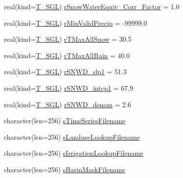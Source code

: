 \begin{DoxyCompactItemize}
\item 
real(kind=\hyperlink{namespacetypes_af3012489af4c138f271f1bce244b7e51}{T\_\-SGL}) \hyperlink{typetypes_1_1_t___m_o_d_e_l___c_o_n_f_i_g_u_r_a_t_i_o_n_a633b7317b357bdd5ec1837e6bf8c71dc}{rSnowWaterEquiv\_\-Corr\_\-Factor} = 1.0
\item 
real(kind=\hyperlink{namespacetypes_af3012489af4c138f271f1bce244b7e51}{T\_\-SGL}) \hyperlink{typetypes_1_1_t___m_o_d_e_l___c_o_n_f_i_g_u_r_a_t_i_o_n_a77f058263705478632125ac1d964d785}{rMinValidPrecip} = -\/99999.0
\item 
real(kind=\hyperlink{namespacetypes_af3012489af4c138f271f1bce244b7e51}{T\_\-SGL}) \hyperlink{typetypes_1_1_t___m_o_d_e_l___c_o_n_f_i_g_u_r_a_t_i_o_n_a849eb6df6879c3e23519f49f9d65322c}{rTMaxAllSnow} = 30.5
\item 
real(kind=\hyperlink{namespacetypes_af3012489af4c138f271f1bce244b7e51}{T\_\-SGL}) \hyperlink{typetypes_1_1_t___m_o_d_e_l___c_o_n_f_i_g_u_r_a_t_i_o_n_a1368525b4e815a98e8547ca59b47068e}{rTMaxAllRain} = 40.0
\item 
real(kind=\hyperlink{namespacetypes_af3012489af4c138f271f1bce244b7e51}{T\_\-SGL}) \hyperlink{typetypes_1_1_t___m_o_d_e_l___c_o_n_f_i_g_u_r_a_t_i_o_n_a7b7f6e5e817b0404fea20ae828fea7e6}{rSNWD\_\-slp1} = 51.3
\item 
real(kind=\hyperlink{namespacetypes_af3012489af4c138f271f1bce244b7e51}{T\_\-SGL}) \hyperlink{typetypes_1_1_t___m_o_d_e_l___c_o_n_f_i_g_u_r_a_t_i_o_n_a161b512f5dbd8520728de20c53e00d6c}{rSNWD\_\-intcp1} = 67.9
\item 
real(kind=\hyperlink{namespacetypes_af3012489af4c138f271f1bce244b7e51}{T\_\-SGL}) \hyperlink{typetypes_1_1_t___m_o_d_e_l___c_o_n_f_i_g_u_r_a_t_i_o_n_a3df792affe14af9821dddc977322a6d9}{rSNWD\_\-denom} = 2.6
\item 
character(len=256) \hyperlink{typetypes_1_1_t___m_o_d_e_l___c_o_n_f_i_g_u_r_a_t_i_o_n_a84d027a4ad104b1fbecc5a051a596830}{sTimeSeriesFilename}
\item 
character(len=256) \hyperlink{typetypes_1_1_t___m_o_d_e_l___c_o_n_f_i_g_u_r_a_t_i_o_n_a75f2584d98a1e5ea6789c840e12921ea}{sLanduseLookupFilename}
\item 
character(len=256) \hyperlink{typetypes_1_1_t___m_o_d_e_l___c_o_n_f_i_g_u_r_a_t_i_o_n_a2bab72367e4cf1e97d0715a0903366e6}{sIrrigationLookupFilename}
\item 
character(len=256) \hyperlink{typetypes_1_1_t___m_o_d_e_l___c_o_n_f_i_g_u_r_a_t_i_o_n_aa430859b156cb6d8c156238f1bb96bc2}{sBasinMaskFilename}
\item 

\end{DoxyCompactItemize}
